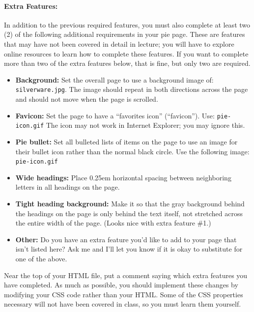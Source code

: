 \documentclass{article}
\begin{document}
\paragraph{Extra Features:} In addition to the previous required features,
  you must also complete at least two (2) of the following additional
  requirements in your pie page. These are features that may have not
  been covered in detail in lecture; you will have to explore 
  online resources to learn how to complete these features. If you want to
  complete more than two of the extra features below, that is fine,
  but only two are required.
  \begin{itemize}
  \item {\bf Background:}  Set the overall page to use a background image of:
    {\tt silverware.jpg}. The image should repeat in both directions
    across the page and should not move when the page is scrolled.
  \item {\bf Favicon:}  Set the page to have a ``favorites icon''
    (``favicon''). Use: {\tt pie-icon.gif} The icon may not work in
    Internet Explorer; you may ignore this.
  \item {\bf Pie bullet:}  Set all bulleted lists of items on the page to use
    an image for their bullet icon rather than the normal black
    circle. Use the following image: {\tt pie-icon.gif}
  \item {\bf Wide headings:}  Place 0.25em horizontal spacing between
    neighboring letters in all headings on the page.
  \item {\bf Tight heading background:}  Make it so that the gray background
    behind the headings on the page is only behind the text itself,
    not stretched across the entire width of the page. (Looks nice
    with extra feature \#1.)
  \item {\bf Other:}  Do you have an extra feature you'd like to add to
    your page that isn't listed here? Ask me and I'll let you know if
    it is okay to substitute for one of the above.
  \end{itemize}
  Near the top of your HTML file, put a comment saying which extra
  features you have completed.  As much as possible, you should
  implement these changes by modifying your CSS code rather than your
  HTML.  Some of the CSS properties necessary will not have been
  covered in class, so you must learn them yourself.
\end{document}
